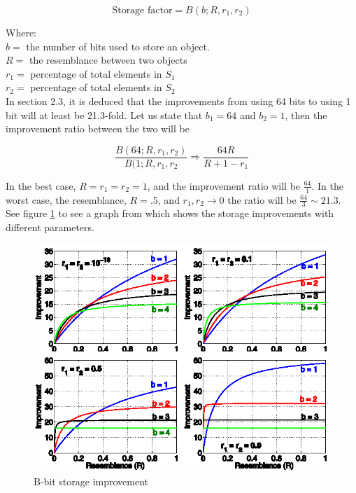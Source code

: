 \documentclass[a4paper,11pt]{article}
\begin{document}
\begin{equation}
    \text {Storage factor} = B(b;R,r_1,r_2)
    \label{eq:storagefactor}
\end{equation}

Where:\\
$b = $ the number of bits used to store an object. \\
$R = $ the resemblance between two objects \\
$r_1 = $ percentage of total elements in $S_1$ \\
$r_2 = $ percentage of total elements in $S_2$ \\

In \cite{article:bbit} section 2.3, it is deduced that the improvements from using 64 bits to using 1 bit will at least be 21.3-fold. Let us state that $b_1 = 64$ and $b_2 = 1$, then the improvement ratio between the two will be

\begin{equation}
    \frac{B(64;R,r_1,r_2)}{B(1;R,r_1,r_2} \Rightarrow \frac{64 R}{R + 1 - r_1}
    \label{eq:improvementratio}
\end{equation}

In the best case, $R = r_1 = r_2 = 1$, and the improvement ratio will be $\frac{64}{1}$. In the worst case, the resemblance, $R=.5$, and $r_1, r_2 \rightarrow 0$ the ratio will be $\frac{64}{3} \sim 21.3$. See figure \ref{fig:bbit} to see a graph from \cite{book:bbit} which shows the storage improvements with different parameters. \\


\begin{figure}[!htpb]
    \begin{center}
        \includegraphics{plots/bbit/bbit.eps}
        \caption{B-bit storage improvement}
        \label{fig:bbit}
    \end{center}
\end{figure}
\end{document}
